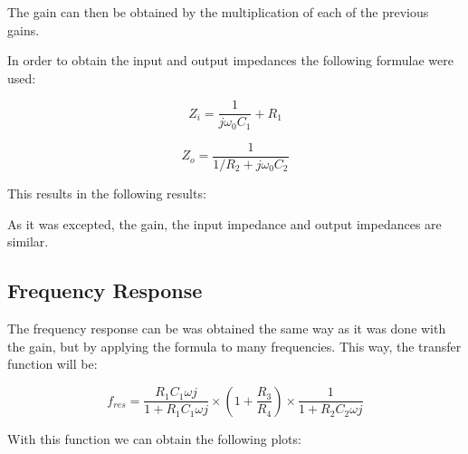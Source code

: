 The gain can then be obtained by the multiplication of each of the previous gains.
 

 
\vspace{1cm}

In order to obtain the input and output impedances the following formulae were used:
\vspace{0.5cm}
 
\[Z_i = \frac{1}{j\omega _0 C_1} + R_1\tag{7}\label{7}\]
 
 \[Z_o = \frac{1}{1/R_2 + j \omega _0 C_2}\tag{8}\label{8}\]



\vspace{1cm}

This results in the following results:

\vspace{0.5cm}
\begin{center}
\end{center}
\vspace{1cm}



As it was excepted, the gain, the input impedance and output impedances are similar. 


\subsection{Frequency Response}

\indent

The frequency response can be was obtained the same way as it was done with the gain, but by applying the formula to many frequencies. This way, the transfer function will be:

\vspace{0.5cm}

\[f_{res}=\frac{R_1 C_1 \omega j}{1 + R_1 C_1 \omega j}\times(1 + \frac{R_3}{R_4}) \times \frac{1}{1+ R_2 C_2 \omega j} \tag{9}\label{9}\]

\vspace{0.5cm}
With this function we can obtain the following plots:

\vspace{0.5cm}

\begin{figure}[h]
    \centering
{}
  \hfill
{}
\end{figure}

